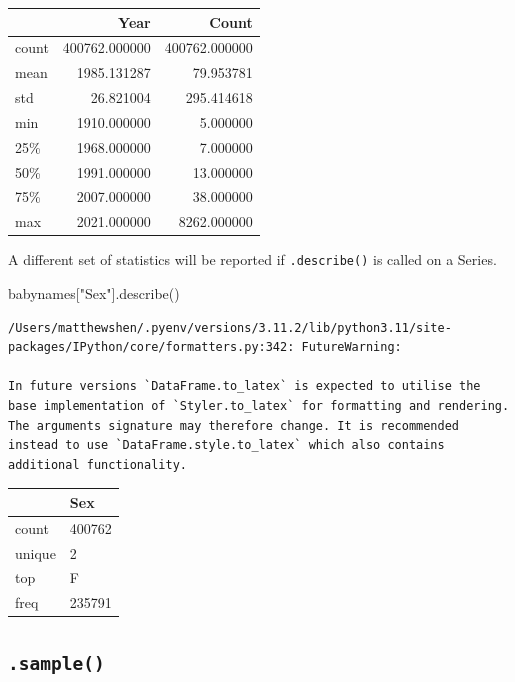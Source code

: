 \documentclass[
  letterpaper,
  DIV=11,
  numbers=noendperiod]{scrreprt}
\newenvironment{Shaded}{\begin{snugshade}}{\end{snugshade}}
\newcommand{\NormalTok}[1]{\textcolor[rgb]{0.00,0.23,0.31}{#1}}
\newcommand{\StringTok}[1]{\textcolor[rgb]{0.13,0.47,0.30}{#1}}
\begin{document}
\begin{tabular}{lrr}
\toprule
{} &           Year &          Count \\
\midrule
count &  400762.000000 &  400762.000000 \\
mean  &    1985.131287 &      79.953781 \\
std   &      26.821004 &     295.414618 \\
min   &    1910.000000 &       5.000000 \\
25\%   &    1968.000000 &       7.000000 \\
50\%   &    1991.000000 &      13.000000 \\
75\%   &    2007.000000 &      38.000000 \\
max   &    2021.000000 &    8262.000000 \\
\bottomrule
\end{tabular}

A different set of statistics will be reported if \texttt{.describe()}
is called on a Series.

\begin{Shaded}
\begin{Highlighting}[]
\NormalTok{babynames[}\StringTok{"Sex"}\NormalTok{].describe()}
\end{Highlighting}
\end{Shaded}

\begin{verbatim}
/Users/matthewshen/.pyenv/versions/3.11.2/lib/python3.11/site-packages/IPython/core/formatters.py:342: FutureWarning:

In future versions `DataFrame.to_latex` is expected to utilise the base implementation of `Styler.to_latex` for formatting and rendering. The arguments signature may therefore change. It is recommended instead to use `DataFrame.style.to_latex` which also contains additional functionality.
\end{verbatim}

\begin{tabular}{ll}
\toprule
{} &     Sex \\
\midrule
count  &  400762 \\
unique &       2 \\
top    &       F \\
freq   &  235791 \\
\bottomrule
\end{tabular}

\hypertarget{sample}{%
\subsection{\texorpdfstring{\texttt{.sample()}}{.sample()}}\label{sample}}
\end{document}
